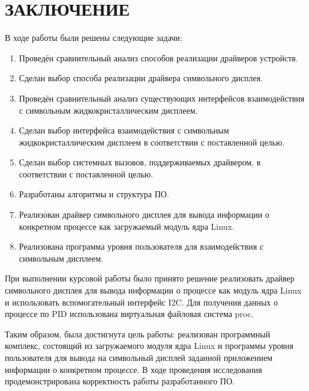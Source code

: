 \chapter*{ЗАКЛЮЧЕНИЕ}

В ходе работы были решены следующие задачи:
\begin{enumerate}
	\item Проведён сравнительный анализ способов реализации драйверов устройств.
	\item Сделан выбор способа реализации драйвера символьного дисплея.
	\item Проведён сравнительный анализ существующих интерфейсов взаимодействия с символьным жидкокристаллическим дисплеем.
	\item Сделан выбор интерфейса взаимодействия с символьным жидкокристаллическим дисплеем в соответствии с поставленной целью.
	\item Сделан выбор системных вызовов, поддерживаемых драйвером, в соответствии с поставленной целью.
	\item Разработаны алгоритмы и структура ПО.
	\item Реализован драйвер символьного дисплея для вывода информации о конкретном процессе как загружаемый модуль ядра Linux.
	\item Реализована программа уровня пользователя для взаимодействия с символьным дисплеем.
\end{enumerate}

При выполнении курсовой работы было принято решение реализовать драйвер символьного дисплея для вывода информации о процессе как модуль ядра Linux и использовать вспомогательный интерфейс I2C. Для получения данных о процессе по PID использована виртуальная файловая система proc.

Таким образом, была достигнута цель работы:  реализован программный комплекс, состоящий из  загружаемого модуля ядра Linux и программы уровня пользователя для вывода на символьный дисплей заданной приложением информации о конкретном процессе. В ходе проведения исследования продемонстрирована корректность работы разработанного ПО.